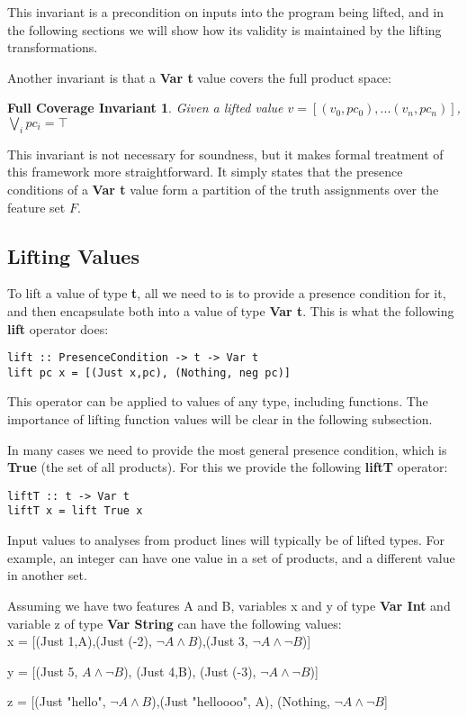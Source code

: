 \documentclass[10pt,conference]{IEEEtran}
\begin{document}
This invariant is a precondition on inputs into the program being lifted, and in the following sections we will show how its validity is maintained by the lifting transformations.

Another invariant is that a \textbf{Var t} value covers the full product space:

\newtheorem*{covInv*}{Full Coverage Invariant}
\begin{covInv*}
Given a lifted value $v = [(v_0, pc_0), ... (v_n, pc_n)]$, $\bigvee_{i} pc_i = \top $
\end{covInv*}

This invariant is not necessary for soundness, but it makes formal treatment of this framework more straightforward. It simply states that the presence conditions of a \textbf{Var t} value form a partition of the truth assignments over the feature set $F$.

\subsection{Lifting Values}

To lift a value of type \textbf{t}, all we need to is to provide a presence condition for it, and then encapsulate both into a value of type \textbf{Var t}. This is what the following \textbf{lift} operator does:

\begin{verbatim}
lift :: PresenceCondition -> t -> Var t
lift pc x = [(Just x,pc), (Nothing, neg pc)]
\end{verbatim}

This operator can be applied to values of any type, including functions. The importance of lifting function values will be clear in the following subsection.

In many cases we need to provide the most general presence condition, which is \textbf{True} (the set of all products). For this we provide the following \textbf{liftT} operator:

\begin{verbatim}
liftT :: t -> Var t
liftT x = lift True x
\end{verbatim}

Input values to analyses from product lines will typically be of lifted types. For example, an integer can have one value in a set of products, and a different value in another set. 

\begin{exmp}

Assuming we have two features A and B, variables x and y of type \textbf{Var Int} and variable z of type \textbf{Var String} can have the following values: \\

x = [(Just 1,A),(Just (-2), $\neg A \wedge B$),(Just 3, $\neg A \wedge \neg B$)]

y = [(Just 5, $A \wedge \neg B$), (Just 4,B), (Just (-3), $\neg A \wedge \neg B$)]

z = [(Just "hello", $\neg A \wedge B$),(Just "helloooo", A), (Nothing, $\neg A \wedge \neg B$] \\

\end{exmp}
\end{document}
